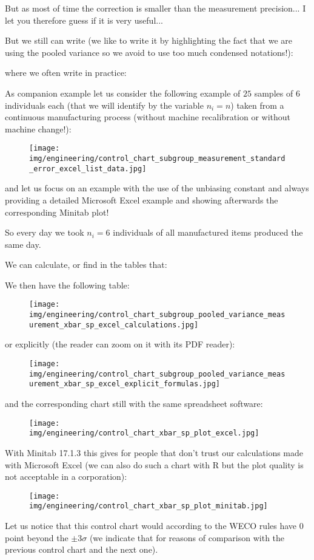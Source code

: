 	But as most of time the correction is smaller than the measurement precision... I let you therefore guess if it is very useful...
	
	But we still can write (we like to write it by highlighting the fact that we are using the pooled variance so we avoid to use too much condensed notations!):
	
	where we often write in practice:
	
	As companion example let us consider the following example of $25$ samples of $6$ individuals each (that we will identify by the variable $n_i=n$) taken from a continuous manufacturing process (without machine recalibration or without machine change!):
 	\begin{figure}[H]
		\centering
		\texttt{[image: img/engineering/control\_chart\_subgroup\_measurement\_standard\_error\_excel\_list\_data.jpg]}
	\end{figure}
	and let us focus on an example with the use of the unbiasing constant and always providing a detailed Microsoft Excel example and showing afterwards the corresponding Minitab plot!
	
	So every day we took $n_i=6$ individuals of all manufactured items produced the same day.
	
	We can calculate, or find in the tables that:
	
	We then have the following table:
	\begin{figure}[H]
		\centering
		\texttt{[image: img/engineering/control\_chart\_subgroup\_pooled\_variance\_measurement\_xbar\_sp\_excel\_calculations.jpg]}
	\end{figure}
	or explicitly (the reader can zoom on it with its PDF reader):
	\begin{figure}[H]
		\centering
		\texttt{[image: img/engineering/control\_chart\_subgroup\_pooled\_variance\_measurement\_xbar\_sp\_excel\_explicit\_formulas.jpg]}
	\end{figure}
	and the corresponding chart still with the same spreadsheet software:
	\begin{figure}[H]
		\centering
		\texttt{[image: img/engineering/control\_chart\_xbar\_sp\_plot\_excel.jpg]}
	\end{figure}
	With Minitab 17.1.3 this gives for people that don't trust our calculations made with Microsoft Excel (we can also do such a chart with R but the plot quality is not acceptable in a corporation):
	\begin{figure}[H]
		\centering
		\texttt{[image: img/engineering/control\_chart\_xbar\_sp\_plot\_minitab.jpg]}
	\end{figure}
	Let us notice that this control chart would according to the WECO rules have $0$ point beyond the $\pm 3\sigma$ (we indicate that for reasons of comparison with the previous control chart and the next one). 
	
